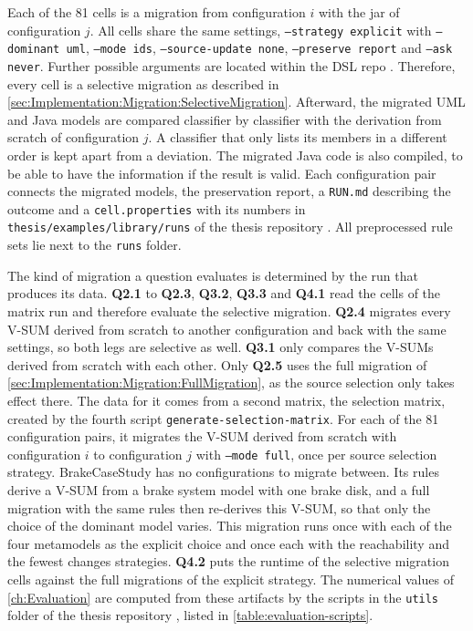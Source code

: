Each of the 81 cells is a migration from configuration $i$ with the jar of configuration $j$.
All cells share the same settings, \texttt{--strategy explicit} with \texttt{--dominant uml}, \texttt{--mode ids}, \texttt{--source-update none}, \texttt{--preserve report} and \texttt{--ask never}.
Further possible arguments are located within the DSL repo \cite{vitruv-dsls-fork}.
Therefore, every cell is a selective migration as described in \autoref{sec:Implementation:Migration:SelectiveMigration}.
Afterward, the migrated UML and Java models are compared classifier by classifier with the derivation from scratch of configuration $j$.
A classifier that only lists its members in a different order is kept apart from a deviation.
The migrated Java code is also compiled, to be able to have the information if the result is valid.
Each configuration pair connects the migrated models, the preservation report, a \texttt{RUN.md} describing the outcome and a \texttt{cell.properties} with its numbers in \texttt{thesis/examples/library/runs} of the thesis repository \cite{thesis-repo}.
All preprocessed rule sets lie next to the \texttt{runs} folder.

The kind of migration a question evaluates is determined by the run that produces its data.
\textbf{Q2.1} to \textbf{Q2.3}, \textbf{Q3.2}, \textbf{Q3.3} and \textbf{Q4.1} read the cells of the matrix run and therefore evaluate the selective migration.
\textbf{Q2.4} migrates every V-SUM derived from scratch to another configuration and back with the same settings, so both legs are selective as well.
\textbf{Q3.1} only compares the V-SUMs derived from scratch with each other.
Only \textbf{Q2.5} uses the full migration of \autoref{sec:Implementation:Migration:FullMigration}, as the source selection only takes effect there.
The data for it comes from a second matrix, the selection matrix, created by the fourth script \texttt{generate-selection-matrix}.
For each of the 81 configuration pairs, it migrates the V-SUM derived from scratch with configuration $i$ to configuration $j$ with \texttt{--mode full}, once per source selection strategy.
BrakeCaseStudy has no configurations to migrate between.
Its rules derive a V-SUM from a brake system model with one brake disk, and a full migration with the same rules then re-derives this V-SUM, so that only the choice of the dominant model varies.
This migration runs once with each of the four metamodels as the explicit choice and once each with the reachability and the fewest changes strategies.
\textbf{Q4.2} puts the runtime of the selective migration cells against the full migrations of the explicit strategy.
The numerical values of \autoref{ch:Evaluation} are computed from these artifacts by the scripts in the \texttt{utils} folder of the thesis repository \cite{thesis-repo}, listed in \autoref{table:evaluation-scripts}.

